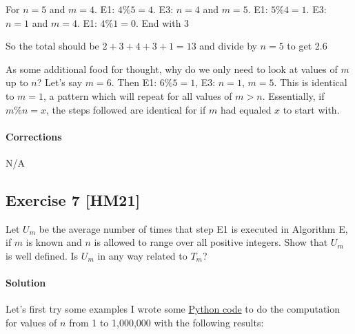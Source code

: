 \documentclass{report}
\begin{document}
			For $n=5$ and $m=4$. E1: $4\%5 = 4$. E3: $n=4$ and $m=5$. E1: $5\%4=1$. E3: $n=1$ and $m=4$. E1: $4\%1=0$. End with 3
			
			So the total should be $2+3+4+3+1=13$ and divide by $n=5$ to get 2.6
			
			As some additional food for thought, why do we only need to look at values of $m$ up to $n$? Let's say $m=6$. Then E1: $6\%5=1$, E3: $n=1$, $m=5$. This is identical to $m=1$, a pattern which will repeat for all values of $m > n$. Essentially, if $m\%n=x$, the steps followed are identical for if $m$ had equaled $x$ to start with.
			
			\paragraph{Corrections} N/A
			
		
		\subsection*{Exercise 7 [HM21]} 
		
			Let $U_m$ be the average number of times that step E1 is executed in Algorithm E, if $m$ is known and $n$ is allowed to range over all positive integers. Show that $U_m$ is well defined. Is $U_m$ in any way related to $T_m$?
			
			\paragraph{Solution} Let's first try some examples I wrote some \href{https://github.com/twigtheoracle/twigtheoracle.com/blob/master/website/mysite/templates/projects/TAOCP/1.1.7.py}{Python code} to do the computation for values of $n$ from 1 to 1,000,000 with the following results:
			
\end{document}
